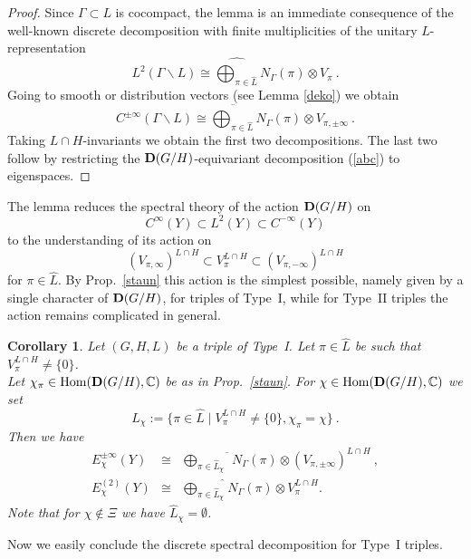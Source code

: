 \documentclass[10]{amsart}
\newtheorem{cor}[thm]{Corollary}
\theoremstyle{remark}
\theoremstyle{definition}
\numberwithin{equation}{section}
\newcommand{\C}{\mathbb{C}}           %
\newcommand{\Hom}{\mathrm{Hom}}
\newcommand{\be}{\begin{equation}}
\begin{document}
{\begin{proof} Since $\Gamma\subset L$ is cocompact, the lemma is an immediate consequence of the well-known discrete decomposition with finite multiplicities of the 
unitary $L$-representation 
%
\be\label{monet} 
L^2(\Gamma\backslash L)\cong\widehat{\bigoplus_{\pi\in\widehat L}} N_\Gamma(\pi)\otimes V_{\pi}\ .
\end{equation}
%
Going to smooth or distribution vectors (see Lemma \ref{deko}) we obtain
%
\be\label{vangogh}
C^{\pm\infty}(\Gamma\backslash L)\cong \overline{\bigoplus_{\pi\in\widehat L}} N_\Gamma(\pi)\otimes V_{\pi,\pm\infty}\ .
\end{equation}
%
Taking $L\cap H$-invariants we obtain the first two decompositions. The last two follow by restricting the ${\bf D}(G/H)$-equivariant decomposition (\ref{abc}) to eigenspaces.
\end{proof}
%
\noindent
The lemma reduces the spectral theory of the action ${\bf D}(G/H)$ on 
$$ C^{\infty}(Y)\subset L^2(Y)\subset C^{-\infty}(Y)$$
to the understanding of its action on 
$$(V_{\pi,\infty})^{L\cap H}\subset V_{\pi}^{L\cap H}\subset(V_{\pi,-\infty})^{L\cap H}$$
for $\pi\in\widehat L$. 
By Prop.~\ref{staun} this action is the simplest possible, namely given by a single character of ${\bf D}(G/H)$, for triples of Type~I, while for Type~II triples the action remains complicated in general.

\begin{cor}\label{hussa} Let $(G,H,L)$ be a triple of Type~I. Let $\pi\in \widehat L$ be such that $V_\pi^{L\cap H}\ne\{0\}$. \\ 
Let $\chi_\pi\in \Hom({\bf D}(G/H),\C)$ be as in Prop.~\ref{staun}.
For $\chi\in \Hom({\bf D}(G/H),\C)$ we set 
$$\widehat L_\chi:=\{\pi\in \widehat L\mid V_\pi^{L\cap H}\ne \{0\}, \chi_\pi=\chi\}\ .$$ 
Then we have
\begin{eqnarray*}
{E}_\chi^{\pm\infty}(Y)&\cong& \overline{\bigoplus_{\pi\in\widehat L_\chi}} N_\Gamma(\pi)\otimes (V_{\pi,\pm\infty})^{L\cap H}\ ,\nonumber\\
{E}_\chi^{(2)}(Y)&\cong &\widehat{\bigoplus_{\pi\in\widehat L_\chi}} N_\Gamma(\pi)\otimes V_{\pi}^{L\cap H}.\nonumber
\end{eqnarray*}
Note that for $\chi\notin \Xi$ we have $\widehat L_\chi=\emptyset$.
\end{cor}

Now we easily conclude the discrete spectral decomposition for Type~I triples.

}
\end{document}
